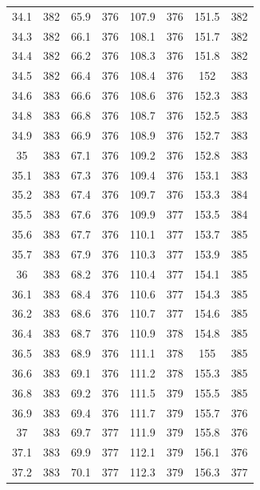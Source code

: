 \documentclass[12pt]{ctexart}
\numberwithin{equation}{section}
\begin{document}
\begin{longtable}{cc|cc|cc|cc}
34.1  &  382  &  65.9  &  376  &  107.9  &  376  &  151.5  &  382  \\
34.3  &  382  &  66.1  &  376  &  108.1  &  376  &  151.7  &  382  \\
34.4  &  382  &  66.2  &  376  &  108.3  &  376  &  151.8  &  382  \\
34.5  &  382  &  66.4  &  376  &  108.4  &  376  &  152  &  383  \\
34.6  &  383  &  66.6  &  376  &  108.6  &  376  &  152.3  &  383  \\
34.8  &  383  &  66.8  &  376  &  108.7  &  376  &  152.5  &  383  \\
34.9  &  383  &  66.9  &  376  &  108.9  &  376  &  152.7  &  383  \\
35  &  383  &  67.1  &  376  &  109.2  &  376  &  152.8  &  383  \\
35.1  &  383  &  67.3  &  376  &  109.4  &  376  &  153.1  &  383  \\
35.2  &  383  &  67.4  &  376  &  109.7  &  376  &  153.3  &  384  \\
35.5  &  383  &  67.6  &  376  &  109.9  &  377  &  153.5  &  384  \\
35.6  &  383  &  67.7  &  376  &  110.1  &  377  &  153.7  &  385  \\
35.7  &  383  &  67.9  &  376  &  110.3  &  377  &  153.9  &  385  \\
36  &  383  &  68.2  &  376  &  110.4  &  377  &  154.1  &  385  \\
36.1  &  383  &  68.4  &  376  &  110.6  &  377  &  154.3  &  385  \\
36.2  &  383  &  68.6  &  376  &  110.7  &  377  &  154.6  &  385  \\
36.4  &  383  &  68.7  &  376  &  110.9  &  378  &  154.8  &  385  \\
36.5  &  383  &  68.9  &  376  &  111.1  &  378  &  155  &  385  \\
36.6  &  383  &  69.1  &  376  &  111.2  &  378  &  155.3  &  385  \\
36.8  &  383  &  69.2  &  376  &  111.5  &  379  &  155.5  &  385  \\
36.9  &  383  &  69.4  &  376  &  111.7  &  379  &  155.7  &  376  \\
37  &  383  &  69.7  &  377  &  111.9  &  379  &  155.8  &  376  \\
37.1  &  383  &  69.9  &  377  &  112.1  &  379  &  156.1  &  376  \\
37.2  &  383  &  70.1  &  377  &  112.3  &  379  &  156.3  &  377  \\

\end{longtable}
\end{document}
